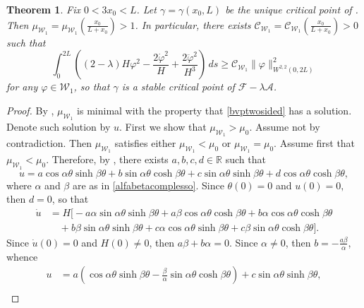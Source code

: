 \documentclass[11pt]{amsart}
\renewcommand{\geq}{\geqslant}
\newcommand{\A}{\mathcal A}
\newcommand{\F}{\mathcal F}
\newcommand{\rr}{{\mathbb{R}}}
\newtheorem{theorem}{Theorem}[section]
\theoremstyle{definition}
\theoremstyle{remark}
\numberwithin{equation}{section}
\begin{document}
\begin{theorem}\label{teoremastabilitaperg}
Fix $0<3x_0<L$.
Let $\gamma=\gamma(x_0,L)$ be the unique critical point of . 
Then $\mu_{\mathcal W_1}=\mu_{\mathcal W_1}\left(\frac{x_0}{L+x_0}\right)>1$. In particular, there exists $\mathcal C_{\mathcal W_1}=\mathcal C_{\mathcal W_1}\left(\frac{x_0}{L+x_0}\right)>0$ such that 
\begin{equation} \label{eq:est_secvarG}
\int_0^{2L}\left((2-\lambda)H\varphi^2-\frac{2\dot\varphi^2}{H}+\frac{2\ddot\varphi^2}{H^3}\right)\,ds\geq\mathcal C_{\mathcal W_1}\|\varphi\|^2_{W^{2,2}(0,2L)}
\end{equation}
for any $\varphi\in\mathcal W_1$, so that $\gamma$ is a stable critical point of $\F-\lambda\A$.
\end{theorem}
\begin{proof}
By , $\mu_{\mathcal W_1}$ is minimal with the property that \eqref{bvptwosided} has a solution. Denote such solution by $u$.
First we show that $\mu_{\mathcal W_1}>\mu_0$.
Assume not by contradiction. Then $\mu_{\mathcal W_1}$ satisfies either $\mu_{\mathcal W_1}<\mu_0$ or $\mu_{\mathcal W_1}=\mu_0$. Assume first that  $\mu_{\mathcal W_1}<\mu_0$. Therefore, by , there exists $a,b,c,d\in\rr$ such that 
\begin{equation*}
u=a\cos \alpha\theta\sinh\beta\theta+b\sin \alpha\theta\cosh\beta\theta+c\sin \alpha\theta\sinh\beta\theta+d\cos \alpha\theta\cosh\beta\theta,
\end{equation*}
where $\alpha$ and $\beta$ are as in \eqref{alfabetacomplesso}. Since $\theta(0)=0$ and $u(0)=0,$ then $d=0$, so that
\begin{align*}
\dot u&=H\big[-a\alpha\sin\alpha\theta\sinh\beta\theta+a\beta\cos\alpha\theta\cosh\beta\theta+b\alpha\cos\alpha\theta\cosh\beta\theta\\
&\quad+b\beta\sin\alpha\theta\sinh\beta\theta+c\alpha\cos\alpha\theta\sinh\beta\theta+c\beta\sin\alpha\theta\cosh\beta\theta\big].
\end{align*}
Since $\dot u(0)=0$ and $H(0)\neq 0$, then $a\beta+b\alpha=0$. Since $\alpha\neq 0$, then $b=-\frac{a\beta}{\alpha}$, whence
\begin{align*}
u&=a\left(\cos \alpha\theta\sinh\beta\theta-\frac{\beta}{\alpha}\sin \alpha\theta\cosh\beta\theta\right)+c\sin \alpha\theta\sinh\beta\theta,\\

\end{align*}
\end{proof}
\end{document}
